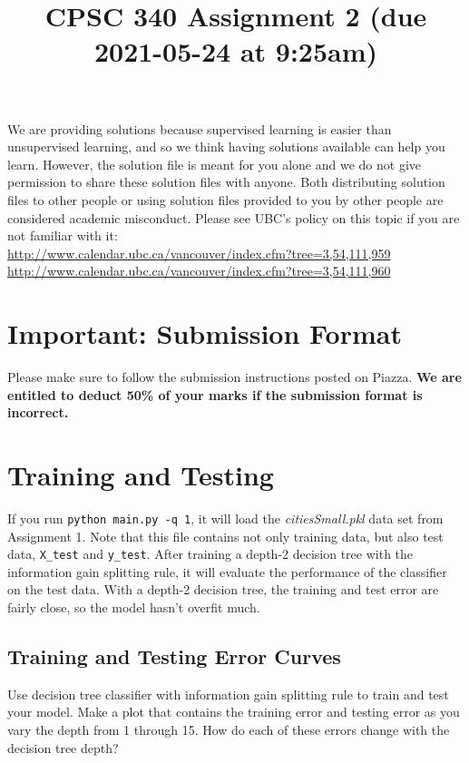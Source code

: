 \documentclass{article}
\def\blu#1{{\color{blu}#1}}
\def\red#1{{\color{red}#1}}
\begin{document}
	
	\title{CPSC 340 Assignment 2 (due 2021-05-24 at 9:25am)}
	\author{}
	\date{}
	\maketitle
	\vspace{-4em}
	
	\red{We are providing solutions because supervised learning is easier than unsupervised learning, and so we think having solutions available can help you learn. However, the solution file is meant for you alone and we do not give permission to share these solution files with anyone. Both distributing solution files to other people or using solution files provided to you by other people are considered academic misconduct. Please see UBC's policy on this topic if you are not familiar with it:\\
		\url{http://www.calendar.ubc.ca/vancouver/index.cfm?tree=3,54,111,959}\\
		\url{http://www.calendar.ubc.ca/vancouver/index.cfm?tree=3,54,111,960}}
	
	\section*{Important: Submission Format}
	
	Please make sure to follow the submission instructions posted on Piazza. \textbf{We are entitled to deduct 50\% of your marks if the submission format is incorrect.}
	
	\section{Training and Testing}
	If you run \texttt{python main.py \string-q 1}, it will load the \emph{citiesSmall.pkl} data set from Assignment 1.
	Note that this file contains not only training data, but also test data, \texttt{X\string_test} and \texttt{y\string_test}.
	After training a depth-2 decision tree with the information gain splitting rule, it will evaluate the performance of the classifier on the test data.
	With a depth-2 decision tree, the training and test error are fairly close, so the model hasn't overfit much.
	
	\subsection{Training and Testing Error Curves}
	
	Use decision tree classifier with information gain splitting rule to train and test your model. \blu{Make a plot that contains the training error and testing error as you vary the depth from 1 through 15. How do each of these errors change with the decision tree depth?}
	
\end{document}
